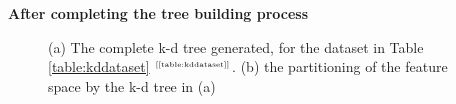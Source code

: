 \documentclass[xcolor={table}]{beamer}
\newcommand{\ourRef}[1]{\ref{#1} $^{\text{\tiny[\pageref{#1}]}}$}
\begin{document}
\begin{frame} [plain]
\begin{example}
\begin{center}
\textbf{After completing the tree building process}
\end{center}
\begin{figure}[htb]
	\begin{center}
	\end{center}
       \caption{(a) The complete k-d tree generated, for the dataset in Table \ourRef{table:kddataset}. (b) the partitioning of the feature space by the k-d tree in (a)}	
	\label{fig:kdtreeexam3}
\end{figure}
\end{example}
\end{frame} 
\end{document}
